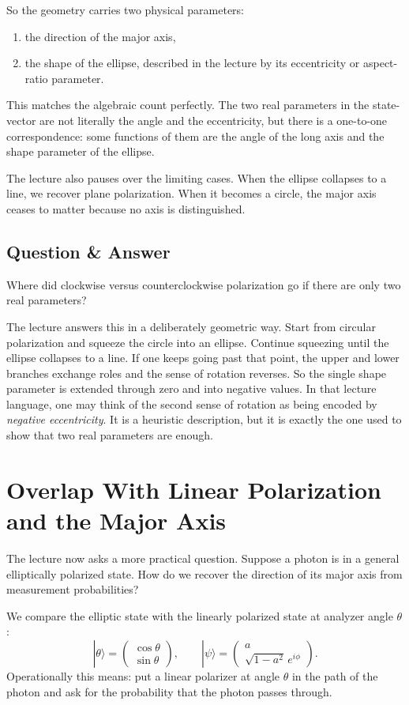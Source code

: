 So the geometry carries two physical parameters:
\begin{enumerate}
\item the direction of the major axis,
\item the shape of the ellipse, described in the lecture by its eccentricity or aspect-ratio parameter.
\end{enumerate}
This matches the algebraic count perfectly. The two real parameters in the state-vector are not literally the angle and the eccentricity, but there is a one-to-one correspondence: some functions of them are the angle of the long axis and the shape parameter of the ellipse.

The lecture also pauses over the limiting cases. When the ellipse collapses to a line, we recover plane polarization. When it becomes a circle, the major axis ceases to matter because no axis is distinguished.

\subsection{Question \& Answer}

Where did clockwise versus counterclockwise polarization go if there are only two real parameters?

The lecture answers this in a deliberately geometric way. Start from circular polarization and squeeze the circle into an ellipse. Continue squeezing until the ellipse collapses to a line. If one keeps going past that point, the upper and lower branches exchange roles and the sense of rotation reverses. So the single shape parameter is extended through zero and into negative values. In that lecture language, one may think of the second sense of rotation as being encoded by \emph{negative eccentricity}. It is a heuristic description, but it is exactly the one used to show that two real parameters are enough.

\section{Overlap With Linear Polarization and the Major Axis}

The lecture now asks a more practical question. Suppose a photon is in a general elliptically polarized state. How do we recover the direction of its major axis from measurement probabilities?

We compare the elliptic state with the linearly polarized state at analyzer angle $\theta$:
\begin{equation}
|\theta\rangle=
\begin{pmatrix}
\cos\theta\\
\sin\theta
\end{pmatrix},
\qquad
|\psi\rangle=
\begin{pmatrix}
a\\
\sqrt{1-a^2}\,e^{i\phi}
\end{pmatrix}.
\end{equation}
Operationally this means: put a linear polarizer at angle $\theta$ in the path of the photon and ask for the probability that the photon passes through.

